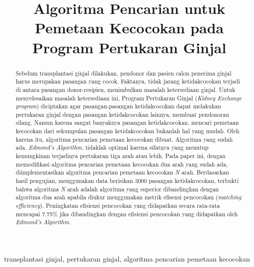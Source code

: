 \documentclass[conference]{IEEEtran}
\begin{document}
\title{Algoritma Pencarian untuk Pemetaan Kecocokan pada Program Pertukaran Ginjal}

\author{
\and
{}
\and
{}
}

\maketitle

\begin{abstract}
Sebelum transplantasi ginjal dilakukan, pendonor dan pasien calon penerima ginjal harus merupakan pasangan yang cocok.
Faktanya, tidak jarang ketidakcocokan terjadi di antara pasangan donor-resipien, menimbulkan masalah ketersediaan ginjal.
Untuk menyelesaikan masalah ketersediaan ini, Program Pertukaran Ginjal (\textit{Kidney Exchange program}) diciptakan agar
pasangan-pasangan ketidakcocokan dapat melakukan pertukaran ginjal dengan pasangan ketidakcocokan lainnya, membuat pendonoran
silang. Namun karena sangat banyaknya pasangan ketidakcocokan, mencari pemetaan kecocokan dari sekumpulan pasangan ketidakcocokan
bukanlah hal yang mudah. Oleh karena itu, algoritma pencarian pemetaan kecocokan dibuat. Algoritma yang sudah ada, \textit{Edmond's Algorithm},
tidaklah optimal karena sifatnya yang menutup kemungkinan terjadinya pertukaran tiga arah atau lebih. Pada paper ini,
dengan memodifikasi algoritma pencarian pemetaan kecocokan dua arah yang sudah ada, diimplementasikan algoritma pencarian
pemetaan kecocokan \textit{N} arah. Berdasarkan hasil pengujian, menggunakan data berisikan 3000 pasangan ketidakcocokan,
terbukti bahwa algoritma \textit{N} arah adalah algoritma yang superior dibandingkan dengan algoritma dua arah apabila diukur
menggunakan metrik efisensi pencocokan (\textit{matching efficiency}). Peningkatan efisiensi pencocokan yang didapatkan secara
rata-rata mencapai 7.75\% jika dibandingkan dengan efisiensi pencocokan yang didapatkan oleh \textit{Edmond's Algorithm}.
\end{abstract}

\begin{IEEEkeywords}
transplantasi ginjal, pertukaran ginjal, algoritma pencarian pemetaan kecocokan
\end{IEEEkeywords}
\end{document}
